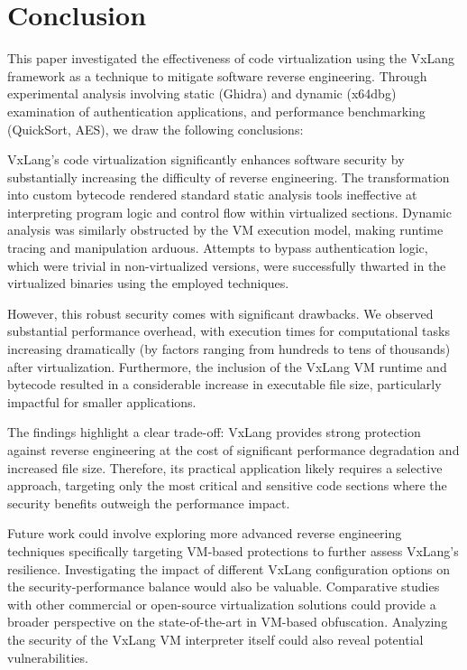 \section{Conclusion} \label{sec:conclusion}
This paper investigated the effectiveness of code virtualization using the VxLang framework as a technique to mitigate software reverse engineering. Through experimental analysis involving static (Ghidra) and dynamic (x64dbg) examination of authentication applications, and performance benchmarking (QuickSort, AES), we draw the following conclusions:

VxLang's code virtualization significantly enhances software security by substantially increasing the difficulty of reverse engineering. The transformation into custom bytecode rendered standard static analysis tools ineffective at interpreting program logic and control flow within virtualized sections. Dynamic analysis was similarly obstructed by the VM execution model, making runtime tracing and manipulation arduous. Attempts to bypass authentication logic, which were trivial in non-virtualized versions, were successfully thwarted in the virtualized binaries using the employed techniques.

However, this robust security comes with significant drawbacks. We observed substantial performance overhead, with execution times for computational tasks increasing dramatically (by factors ranging from hundreds to tens of thousands) after virtualization. Furthermore, the inclusion of the VxLang VM runtime and bytecode resulted in a considerable increase in executable file size, particularly impactful for smaller applications.

The findings highlight a clear trade-off: VxLang provides strong protection against reverse engineering at the cost of significant performance degradation and increased file size. Therefore, its practical application likely requires a selective approach, targeting only the most critical and sensitive code sections where the security benefits outweigh the performance impact.

Future work could involve exploring more advanced reverse engineering techniques specifically targeting VM-based protections to further assess VxLang's resilience. Investigating the impact of different VxLang configuration options on the security-performance balance would also be valuable. Comparative studies with other commercial or open-source virtualization solutions could provide a broader perspective on the state-of-the-art in VM-based obfuscation. Analyzing the security of the VxLang VM interpreter itself could also reveal potential vulnerabilities.
